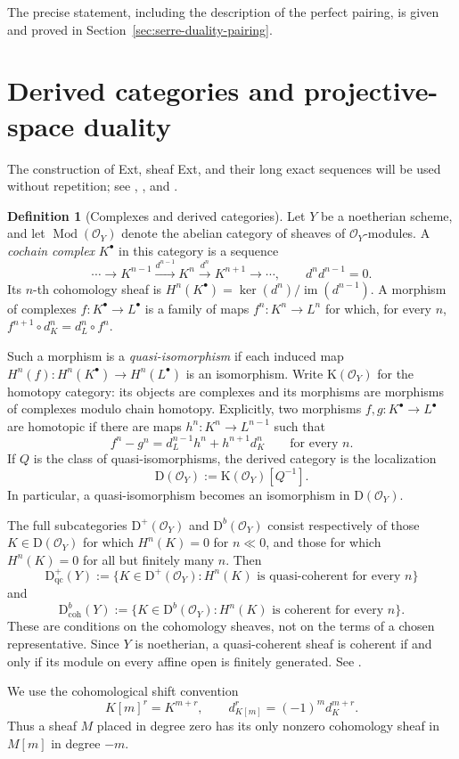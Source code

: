 \documentclass[11pt,a4paper]{article}
\theoremstyle{definition}
\newtheorem{definition}[theorem]{Definition}
\theoremstyle{remark}
\newcommand{\OO}{\mathcal O}
\newcommand{\D}{\mathrm D}
\newcommand{\Dbcoh}{\mathrm D^b_{\mathrm{coh}}}
\begin{document}
The precise statement, including the description of the perfect pairing, is
given and proved in Section~\ref{sec:serre-duality-pairing}.

\section{Derived categories and projective-space duality}

The construction of Ext, sheaf Ext, and their long exact sequences will be
used without repetition; see
\cite[Chapter III, Section 6]{HartshorneAG},
\cite[Sections 10.4 and 10.7]{Weibel}, and
\cite[Tags 06XP and 08DH]{Stacks}.

\begin{definition}[Complexes and derived categories]
\label{def:derived-categories}
Let $Y$ be a noetherian scheme, and let $\operatorname{Mod}(\OO_Y)$ denote
the abelian category of sheaves of $\OO_Y$-modules. A \emph{cochain complex}
$K^\bullet$ in this category is a sequence
\[
  \cdots\longrightarrow K^{n-1}\xrightarrow{d^{n-1}}K^n
  \xrightarrow{d^n}K^{n+1}\longrightarrow\cdots,
  \qquad d^n d^{n-1}=0.
\]
Its $n$-th cohomology sheaf is
$H^n(K^\bullet)=\ker(d^n)/\operatorname{im}(d^{n-1})$. A morphism of
complexes $f:K^\bullet\to L^\bullet$ is a family of maps
$f^n:K^n\to L^n$ for which, for every $n$, $ f^{n+1}\circ d_K^n=d_L^n\circ f^n$.

Such a morphism is a \emph{quasi-isomorphism} if each induced map
$H^n(f):H^n(K^\bullet)\to H^n(L^\bullet)$ is an isomorphism. Write
$\mathrm K(\OO_Y)$ for the homotopy category: its objects are
complexes and its morphisms are morphisms of complexes modulo chain homotopy.
Explicitly, two morphisms $f,g:K^\bullet\to L^\bullet$ are homotopic if there are maps
$h^n:K^n\to L^{n-1}$ such that
\[
  f^n-g^n=d_L^{n-1}h^n+h^{n+1}d_K^n
  \qquad\text{for every }n.
\]
If $Q$ is the class of quasi-isomorphisms, the derived category is the localization
\[
  \D(\OO_Y):=\mathrm K(\OO_Y)[Q^{-1}].
\]
In particular, a quasi-isomorphism becomes an isomorphism in $\D(\OO_Y)$.

The full subcategories $\D^+(\OO_Y)$ and $\D^b(\OO_Y)$ consist respectively
of those $K\in\D(\OO_Y)$ for which $H^n(K)=0$ for $n\ll0$, and those for
which $H^n(K)=0$ for all but finitely many $n$. Then
\[
  \D^+_{\mathrm{qc}}(Y)
  :=\{K\in\D^+(\OO_Y):H^n(K)\text{ is quasi-coherent for every }n\}
\]
and
\[
  \Dbcoh(Y)
  :=\{K\in\D^b(\OO_Y):H^n(K)\text{ is coherent for every }n\}.
\]
These are conditions on the cohomology sheaves, not on the terms of a chosen
representative. Since $Y$ is noetherian, a quasi-coherent sheaf is coherent
if and only if its module on every affine open is finitely generated. See
\cite[Tag 01XY]{Stacks}.

We use the cohomological shift convention
\[
  K[m]^r=K^{m+r},\qquad
  d_{K[m]}^r=(-1)^m d_K^{m+r}.
\]
Thus a sheaf $M$ placed in degree zero has its only nonzero cohomology sheaf
in $M[m]$ in degree $-m$.
\end{definition}
\end{document}
